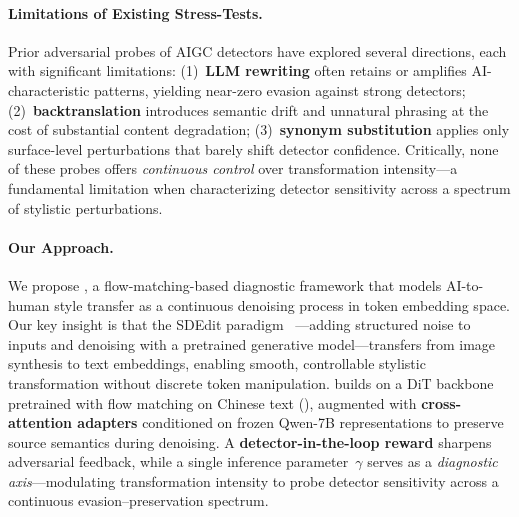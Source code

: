 \paragraph{Limitations of Existing Stress-Tests.}
Prior adversarial probes of AIGC detectors have explored several
directions, each with significant limitations:
(1)~\textbf{LLM rewriting} often retains or amplifies AI-characteristic
patterns, yielding near-zero evasion against strong detectors;
(2)~\textbf{backtranslation} introduces semantic drift and unnatural
phrasing at the cost of substantial content degradation;
(3)~\textbf{synonym substitution} applies only surface-level
perturbations that barely shift detector confidence.
Critically, none of these probes offers \emph{continuous control}
over transformation intensity---a fundamental limitation when
characterizing detector sensitivity across a spectrum of stylistic
perturbations.

\paragraph{Our Approach.}
We propose \styleshield{}, a flow-matching-based diagnostic framework
that models AI-to-human style transfer as a continuous denoising
process in token embedding space.
Our key insight is that the SDEdit paradigm~\citep{meng2022sdedit}
---adding structured noise to inputs and denoising with a pretrained
generative model---transfers from image synthesis to text embeddings,
enabling smooth, controllable stylistic transformation without
discrete token manipulation.
\styleshield{} builds on a DiT backbone pretrained with flow matching
on Chinese text (\langflow{}), augmented with \textbf{cross-attention
adapters} conditioned on frozen Qwen-7B representations to preserve
source semantics during denoising.
A \textbf{detector-in-the-loop reward} sharpens adversarial feedback,
while a single inference parameter~$\gamma$ serves as a
\emph{diagnostic axis}---modulating transformation intensity to probe
detector sensitivity across a continuous evasion--preservation
spectrum.

